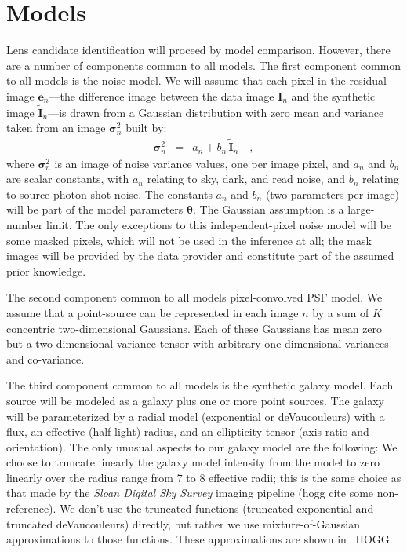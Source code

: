 \documentclass[12pt]{article}
\newcommand{\project}[1]{\textsl{#1}}
\newcounter{hogg}
\renewcommand{\vector}[1]{\boldsymbol{#1}}
\newcommand{\allpars}{\vector{\theta}}
\newcommand{\image}{\vector{I}}
\newcommand{\residual}{\vector{e}}
\newcommand{\synthetic}{\vector{\tilde{I}}}
\newcommand{\variance}{\vector{\sigma}^2}
\begin{document}
\section{Models}

Lens candidate identification will proceed by model comparison.
However, there are a number of components common to all models.  The
first component common to all models is the noise model.  We will
assume that each pixel in the residual image $\residual_n$---the
difference image between the data image $\image_n$ and the synthetic
image $\synthetic_n$---is drawn from a Gaussian distribution with zero
mean and variance taken from an image $\variance_n$ built by:
\begin{eqnarray}\displaystyle
\variance_n &=& a_n + b_n\,\synthetic_n
\quad ,
\end{eqnarray}
where $\variance_n$ is an image of noise variance values, one per
image pixel, and $a_n$ and $b_n$ are scalar constants, with $a_n$
relating to sky, dark, and read noise, and $b_n$ relating to
source-photon shot noise.  The constants $a_n$ and $b_n$ (two
parameters per image) will be part of the model parameters $\allpars$.
The Gaussian assumption is a large-number limit.  The only exceptions
to this independent-pixel noise model will be some masked pixels,
which will not be used in the inference at all; the mask images will
be provided by the data provider and constitute part of the assumed
prior knowledge.

The second component common to all models pixel-convolved PSF model.
We assume that a point-source can be represented in each image $n$ by
a sum of $K$ concentric two-dimensional Gaussians.  Each of these
Gaussians has mean zero but a two-dimensional variance tensor with
arbitrary one-dimensional variances and co-variance.

The third component common to all models is the synthetic galaxy
model.  Each source will be modeled as a galaxy plus one or more point
sources.  The galaxy will be parameterized by a radial model
(exponential or deVaucouleurs) with a flux, an effective (half-light)
radius, and an ellipticity tensor (axis ratio and orientation).  The
only unusual aspects to our galaxy model are the following: We choose
to truncate linearly the galaxy model intensity from the model to zero
linearly over the radius range from 7 to 8 effective radii; this is
the same choice as that made by the \project{Sloan Digital Sky Survey}
imaging pipeline (hogg cite some non-reference).  We don't use the
truncated functions (truncated exponential and truncated
deVaucouleurs) directly, but rather we use mixture-of-Gaussian
approximations to those functions.  These approximations are shown in
\figurename~HOGG.
\end{document}
